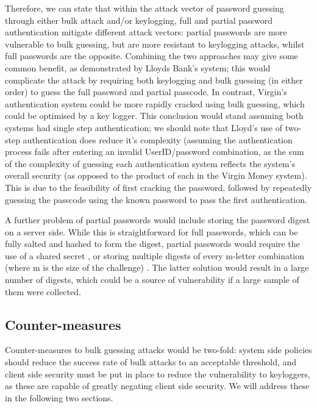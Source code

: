 \documentclass[british,11pt,a4paper]{article}
\begin{document}
Therefore, we can state that within the attack vector of password guessing through either bulk attack and/or keylogging, full and partial password authentication mitigate different attack vectors: partial passwords are more vulnerable to bulk guessing, but are more resistant to keylogging attacks, whilst full passwords are the opposite. Combining the two approaches may give some common benefit, as demonstrated by Lloyds Bank's system; this would complicate the attack by requiring both keylogging and bulk guessing (in either order) to guess the full password and partial passcode. In contrast, Virgin's authentication system could be more rapidly cracked using bulk guessing, which could be optimised by a key logger. This conclusion would stand assuming both systems had single step authentication; we should note that Lloyd's use of two-step authentication does reduce it's complexity (assuming the authentication process fails after entering an invalid UserID/password combination, as the sum of the complexity of guessing each authentication system reflects the system's overall security (as opposed to the product of each in the Virgin Money system). This is due to the feasibility of first cracking the password, followed by repeatedly guessing the passcode using the known password to pass the first authentication.

A further problem of partial passwords would include storing the password digest on a server side. While this is straightforward for full passwords, which can be fully salted and hashed to form the digest, partial passwords would require the use of a shared secret \cite{smartarchitect}, or storing multiple digests of every m-letter combination (where m is the size of the challenge) \cite{smartarchitect}. The latter solution would result in a large number of digests, which could be a source of vulnerability if a large sample of them were collected. 





\subsection{Counter-measures}
Counter-measures to bulk guessing attacks would be two-fold: system side policies should reduce the success rate of bulk attacks to an acceptable threshold, and client side security must be put in place to reduce the vulnerability to keyloggers, as these are capable of greatly negating client side security. We will address these in the following two sections.
\end{document}
